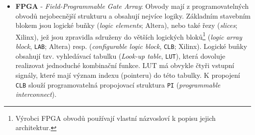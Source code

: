 \begin{itemize}
        \item \textbf{FPGA} - \emph{Field-Programmable Gate Array}: Obvody mají z 
              programovatelných obvodů nejobecnější strukturu  a obsahují nejvíce logiky. Základním 
              stavebním blokem jsou logické buňky (\emph{\emph{logic elements}}; Altera), nebo   
              také řezy (\emph{slices}; Xilinx), jež jsou zpravidla sdruženy do větších logických 
              bloků\footnote{Výrobci FPGA obvodů používají vlastní názvosloví k popisu jejich 
              architektur.} (\emph{logic array block}, \texttt{LAB}; Altera) resp.          
              (\emph{configurable logic block}, \texttt{CLB}; Xilinx). Logické buňky obsahují tzv. 
              vyhledávací tabulku (\emph{Look-up table}, \texttt{LUT}), která dovoluje realizovat 
              jednoduché kombinační funkce. LUT má obvykle čtyři vstupní signály, které mají význam 
              indexu (pointeru) do této tabulky. K propojení \texttt{CLB} slouží programovatelná 
              propojovací struktura \texttt{PI} (\emph{programmable interconnect}).
    \end{itemize}

